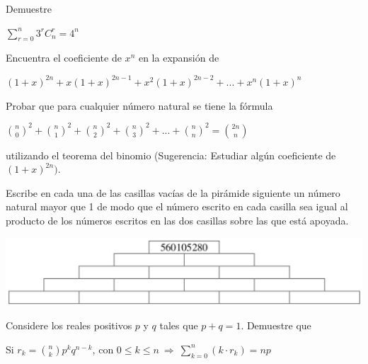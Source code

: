 \begin{ejercicio}
    Demuestre

    \begin{center}
        $\sum_{r=0}^{n} 3^{r} C^{r}_{n} = 4^{n}$
    \end{center}
\end{ejercicio}

\begin{ejercicio}
    Encuentra el coeficiente de $x^n$ en la expansión de

    \begin{center}
        $(1+x)^{2n} + x (1+x)^{2n-1} + x^2 (1+x)^{2n-2} + ... + x^n (1+x)^{n}$
    \end{center}
\end{ejercicio}

\begin{ejercicio}
    Probar que para cualquier número natural se tiene la fórmula

    \begin{center}
        $\binom{n}{0}^2 + \binom{n}{1}^2 + \binom{n}{2}^2 + \binom{n}{3}^2 + ... + \binom{n}{n}^2 = \binom{2n}{n}$
    \end{center}

    utilizando el teorema del binomio (Sugerencia: Estudiar algún coeficiente de $(1 +x)^{2n})$.
\end{ejercicio}

\begin{ejercicio}
    Escribe en cada una de las casillas vacías de la pirámide siguiente un número natural mayor que 1 de modo que el número escrito en cada casilla sea igual al producto de los números escritos en las dos casillas sobre las que está apoyada.

    \begin{center}
        \includegraphics[scale=0.6]{Imagenes/IMG5/Piramide.png}
    \end{center}
\end{ejercicio}

\begin{ejercicio}
    Considere los reales positivos $p$ y $q$ tales que $p+q=1$. Demuestre que

    \begin{center}
        Si $r_k = \binom{n}{k} p^{k}q^{n-k}$, con $0 \leq k \leq n \ \Rightarrow \ \sum_{k=0}^{n} (k \cdot r_k) = np$
    \end{center}
\end{ejercicio}

